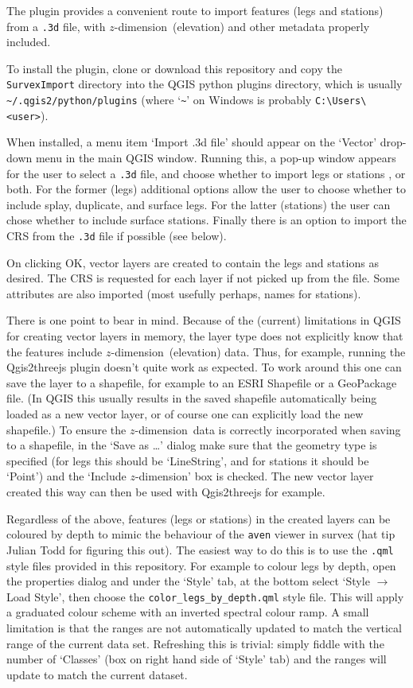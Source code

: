 \documentclass[]{article}
\newcommand{\zdimension}{$z$-dimension}
\begin{document}
The plugin provides a convenient route to import features (legs and
stations) from a \verb}.3d} file, with \zdimension\ (elevation) and
other metadata properly included.

To install the plugin, clone or download this repository and copy the
\verb}SurvexImport} directory into the QGIS python plugins directory,
which is usually \verb}~/.qgis2/python/plugins} (where
`\verb}~}' on Windows is probably
\verb}C:\Users\<user>}).

When installed, a menu item `Import .3d file' should appear on the
`Vector' drop-down menu in the main QGIS window. Running this, a pop-up
window appears for the user to select a \verb}.3d} file, and choose
whether to import legs or stations , or both. For the former (legs)
additional options allow the user to choose whether to include splay,
duplicate, and surface legs. For the latter (stations) the user can
chose whether to include surface stations. Finally there is an option to
import the CRS from the \verb}.3d} file if possible (see below).

On clicking OK, vector layers are created to contain the legs and
stations as desired. The CRS is requested for each layer if not picked
up from the file. Some attributes are also imported (most usefully
perhaps, names for stations).

There is one point to bear in mind. Because of the (current) limitations
in QGIS for creating vector layers in memory, the layer type does not
explicitly know that the features include \zdimension\ (elevation) data.
Thus, for example, running the Qgis2threejs plugin doesn't quite work as
expected. To work around this one can save the layer to a shapefile, for
example to an ESRI Shapefile or a GeoPackage file. (In QGIS this usually
results in the saved shapefile automatically being loaded as a new
vector layer, or of course one can explicitly load the new shapefile.)
To ensure the \zdimension\ data is correctly incorporated when saving to
a shapefile, in the `Save as \dots' dialog make sure that the
geometry type is specified (for legs this should be `LineString', and
for stations it should be `Point') and the `Include \zdimension' box is
checked. The new vector layer created this way can then be used with
Qgis2threejs for example.

Regardless of the above, features (legs or stations) in the created
layers can be coloured by depth to mimic the behaviour of the
\verb}aven} viewer in survex (hat tip Julian Todd for figuring this
out). The easiest way to do this is to use the \verb}.qml} style files
provided in this repository. For example to colour legs by depth, open
the properties dialog and under the `Style' tab, at the bottom select
`Style $\rightarrow$ Load Style', then choose the
\verb}color_legs_by_depth.qml} style file. This will apply a
graduated colour scheme with an inverted spectral colour ramp. A small
limitation is that the ranges are not automatically updated to match the
vertical range of the current data set. Refreshing this is trivial:
simply fiddle with the number of `Classes' (box on right hand side of
`Style' tab) and the ranges will update to match the current dataset.
\end{document}
